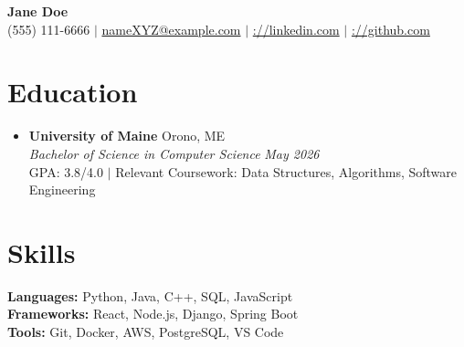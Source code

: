 \documentclass[letterpaper,11pt]{article}
\begin{document}
\begin{center}
    \textbf{\huge Jane Doe} \\ \vspace{5pt}
    \small 
    (555) 111-6666 $|$ 
    \href{mailto:nameXYZ@example.com}{nameXYZ@example.com} $|$ 
    \href{https://linkedin.com}{://linkedin.com} $|$ 
    \href{https://github.com}{://github.com}
\end{center}


\section{Education}
  \begin{itemize}[leftmargin=*]
    \item[]
      \textbf{University of Maine} \hfill Orono, ME \\
      \textit{Bachelor of Science in Computer Science} \hfill \textit{May 2026} \\
      \small{GPA: 3.8/4.0 $|$ Relevant Coursework: Data Structures, Algorithms, Software Engineering}
  \end{itemize}


\section{Skills}
 \begin{itemize}[leftmargin=0.15in, label={}]
    \small{\item{
     \textbf{Languages:} Python, Java, C++, SQL, JavaScript \\
     \textbf{Frameworks:} React, Node.js, Django, Spring Boot \\
     \textbf{Tools:} Git, Docker, AWS, PostgreSQL, VS Code
    }}
 \end{itemize}


\end{document}
